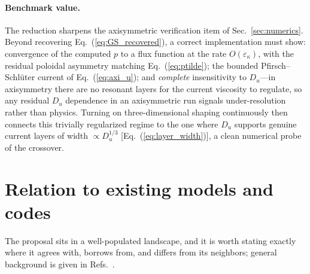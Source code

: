 \documentclass[english]{article}
\begin{document}
\paragraph{Benchmark value.}
The reduction sharpens the axisymmetric verification item of Sec.~\ref{sec:numerics}. Beyond
recovering Eq.~(\ref{eq:GS_recovered}), a correct implementation must show: convergence of the
computed $p$ to a flux function at the rate $O(\varepsilon_\kappa)$, with the residual poloidal
asymmetry matching Eq.~(\ref{eq:ptilde}); the bounded Pfirsch--Schl\"uter current of
Eq.~(\ref{eq:axi_u}); and \emph{complete} insensitivity to $D_u$---in axisymmetry there are no
resonant layers for the current viscosity to regulate, so any residual $D_u$ dependence in an
axisymmetric run signals under-resolution rather than physics. Turning on three-dimensional
shaping continuously then connects this trivially regularized regime to the one where $D_u$
supports genuine current layers of width $\propto D_u^{1/3}$
[Eq.~(\ref{eq:layer_width})], a clean numerical probe of the crossover.


\section{Relation to existing models and codes}
\label{sec:relation}

The proposal sits in a well-populated landscape, and it is worth stating exactly where it agrees
with, borrows from, and differs from its neighbors; general background is given in
Refs.~\cite{helander2014,boozer2004}.
\end{document}
